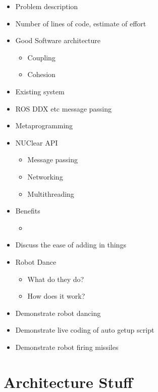 \documentclass{beamer}
\begin{document}
\begin{itemize}
	\item Problem description
	\item Number of lines of code, estimate of effort
	\item Good Software architecture
	\begin{itemize}
		\item Coupling
		\item Cohesion
	\end{itemize}
	\item Existing system
	\item ROS DDX etc message passing
	\item Metaprogramming
	\item NUClear API
	\begin{itemize}
		\item Message passing
		\item Networking
		\item Multithreading
	\end{itemize}
	\item Benefits
	\begin{itemize}
		\item 
	\end{itemize}
	\item Discuss the ease of adding in things
	\item Robot Dance
	\begin{itemize}
		\item What do they do?
		\item How does it work?
	\end{itemize}
	\item Demonstrate robot dancing
	\item Demonstrate live coding of auto getup script
	\item Demonstrate robot firing missiles
\end{itemize}


\section{Architecture Stuff}
\begin{frame}
	\sectionpage
\end{frame}

\end{document}
